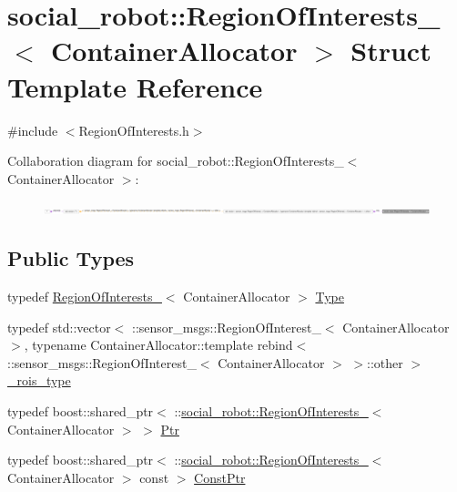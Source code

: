 \hypertarget{structsocial__robot_1_1RegionOfInterests__}{
\section{social\_\-robot::RegionOfInterests\_\-$<$ ContainerAllocator $>$ Struct Template Reference}
\label{structsocial__robot_1_1RegionOfInterests__}
}


{\ttfamily \#include $<$RegionOfInterests.h$>$}



Collaboration diagram for social\_\-robot::RegionOfInterests\_\-$<$ ContainerAllocator $>$:\nopagebreak
\begin{figure}[H]
\begin{center}
\leavevmode
\includegraphics[width=400pt]{structsocial__robot_1_1RegionOfInterests____coll__graph}
\end{center}
\end{figure}
\subsection*{Public Types}
\begin{DoxyCompactItemize}
\item 
typedef \hyperlink{structsocial__robot_1_1RegionOfInterests__}{RegionOfInterests\_\-}$<$ ContainerAllocator $>$ \hyperlink{structsocial__robot_1_1RegionOfInterests___a7c9c9ece4c1a37cadea3ef6e9ba913c2}{Type}
\item 
typedef std::vector$<$ ::sensor\_\-msgs::RegionOfInterest\_\-$<$ ContainerAllocator $>$, typename ContainerAllocator::template rebind$<$ ::sensor\_\-msgs::RegionOfInterest\_\-$<$ ContainerAllocator $>$ $>$::other $>$ \hyperlink{structsocial__robot_1_1RegionOfInterests___aa1fccf0590660a07bacd76159ca8dc42}{\_\-rois\_\-type}
\item 
typedef boost::shared\_\-ptr$<$ ::\hyperlink{structsocial__robot_1_1RegionOfInterests__}{social\_\-robot::RegionOfInterests\_\-}$<$ ContainerAllocator $>$ $>$ \hyperlink{structsocial__robot_1_1RegionOfInterests___affa13225dd210fc9f022418ff1a77c44}{Ptr}
\item 
typedef boost::shared\_\-ptr$<$ ::\hyperlink{structsocial__robot_1_1RegionOfInterests__}{social\_\-robot::RegionOfInterests\_\-}$<$ ContainerAllocator $>$ const  $>$ \hyperlink{structsocial__robot_1_1RegionOfInterests___ae75b9b0cb5dd5c60b34d9e0890994385}{ConstPtr}
\end{DoxyCompactItemize}
